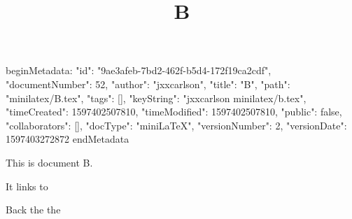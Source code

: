 beginMetadata:
{
    "id": "9ae3afeb-7bd2-462f-b5d4-172f19ca2cdf",
    "documentNumber": 52,
    "author": "jxxcarlson",
    "title": "B",
    "path": "minilatex/B.tex",
    "tags": [],
    "keyString": "jxxcarlson minilatex/b.tex",
    "timeCreated": 1597402507810,
    "timeModified": 1597402507810,
    "public": false,
    "collaborators": [],
    "docType": "miniLaTeX",
    "versionNumber": 2,
    "versionDate": 1597403272872
}
endMetadata
\title{B}

\maketitle

This is document B.

It links to 


Back the the 
